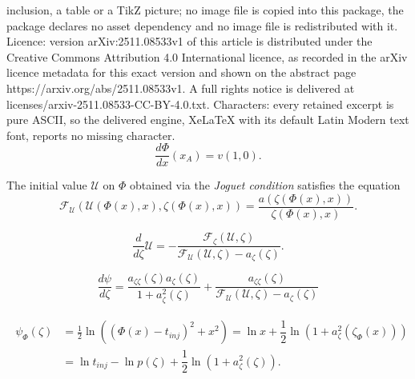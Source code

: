 \documentclass[10pt,a4paper]{amsart}
\begin{document}
inclusion, a table or a TikZ picture; no image file is copied into this package, the package declares no asset dependency and no image file is redistributed with it. Licence: version arXiv:2511.08533v1 of this article is distributed under the Creative Commons Attribution 4.0 International licence, as recorded in the arXiv licence metadata for this exact version and shown on the abstract page https://arxiv.org/abs/2511.08533v1. A full rights notice is delivered at licenses/arxiv-2511.08533-CC-BY-4.0.txt. Characters: every retained excerpt is pure ASCII, so the delivered engine, XeLaTeX with its default Latin Modern text font, reports no missing character.
\begin{equation}
\label{eq:dPhi_dx_at_A}
\frac{d\Phi}{d x}(x_A) = v(1, 0).
\end{equation}

\begin{definition}
The initial value $\mathcal U$ on $\Phi$ obtained via the \emph{Joguet condition} satisfies the equation
\begin{equation}
\label{eq:Joguet_cond} 
\mathcal F_{\mathcal U}(\mathcal U(\Phi(x), x), \zeta(\Phi(x), x)) = \frac{a(\zeta(\Phi(x), x))}{\zeta(\Phi(x), x)}.
\end{equation} 
\end{definition}

\begin{equation}
\label{eq:U-char-of-c}
\dfrac{d}{d\zeta} \mathcal U = -\dfrac{\mathcal F_{\zeta}(\mathcal U, \zeta)}{\mathcal F_{\mathcal U}(\mathcal U, \zeta) - a_\zeta(\zeta)}.  
\end{equation}

\begin{equation}
\label{eq:d_psi_d_zeta}
    \frac{d\psi}{d\zeta} = \frac{a_{\zeta\zeta}(\zeta)a_\zeta(\zeta)}{1 + a_\zeta^2(\zeta)} + \frac{a_{\zeta\zeta}(\zeta)}{\mathcal F_{\mathcal U}(\mathcal U, \zeta) - a_\zeta(\zeta)}
\end{equation}

\begin{align}
\label{eq:psi_Phi_definition}
\begin{split}
\psi_\Phi(\zeta) &= \frac12\ln((\Phi(x) - t_{inj})^2 + x^2) = \ln x + \dfrac{1}{2}\ln(1+ a^2_\zeta(\zeta_\Phi(x))) \\
{} &= \ln t_{inj} - \ln p(\zeta) + \dfrac{1}{2}\ln(1+ a^2_\zeta(\zeta)).
\end{split}
\end{align}
\end{document}
